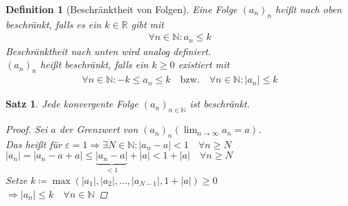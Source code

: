 \documentclass[11pt, twoside, a4paper]{article}
\theoremstyle{plain}
\newtheorem{definition}[blockelement]{Definition}
\newtheorem{satz}[blockelement]{Satz}
\newcommand{\pair}[1]{\left(#1\right)}
\newcommand{\abs}[1]{\left|#1\right|}
\newcommand{\impl}[0]{\Rightarrow{}}
\newcommand{\definedas}[0]{\coloneqq}
\newcommand{\fromto}{\rightarrow{}}
\newcommand{\naturalnumbers}{\mathbb{N}}
\newcommand{\realnumbers}{\mathbb{R}}
\begin{document}
    \begin{definition}[Beschränktheit von Folgen]
        Eine Folge $(a_n)_n$ heißt nach oben beschränkt, falls es ein $k\in\realnumbers$ gibt mit
        \begin{align*}
            \forall n\in \naturalnumbers\colon a_n \leq k\tag{$k$ ist obere Schranke für $(a_n)_n$}
        \end{align*}
        Beschränktheit nach unten wird analog definiert.\\
        $(a_n)_n$ heißt beschränkt, falls ein $k\geq 0$ existiert mit
        \begin{align*}
            \forall n\in\naturalnumbers\colon -k \leq a_n \leq k\quad \text{bzw.}\quad \forall n\in\naturalnumbers\colon \abs{a_n} \leq k
        \end{align*}
    \end{definition}

    \begin{satz}
        \label{satz:konv-folg-beschr}
        Jede konvergente Folge $(a_n)_{n\in\naturalnumbers}$ ist beschränkt.
        \begin{proof}
            Sei $a$ der Grenzwert von $(a_n)_n$\quad $\pair{\lim_{n\fromto\infty} a_n = a}$.\\
            Das heißt für $\varepsilon = 1 \impl \exists N\in\naturalnumbers\colon \abs{a_n-a} < 1\quad\forall n\geq N$\\
            $\abs{a_n} = \abs{a_n-a+a} \leq \underbrace{\abs{a_n-a}}_{<1} + \abs{a} < 1+\abs{a} \quad \forall n\geq N$\\
            Setze $k\definedas \max\pair{\abs{a_1}, \abs{a_2}, \dots, \abs{a_{N-1}}, 1+\abs{a}} \geq 0$\\
            $\impl \abs{a_n} \leq k \quad\forall n\in\naturalnumbers$\qedhere
        \end{proof}
    \end{satz}
\end{document}
